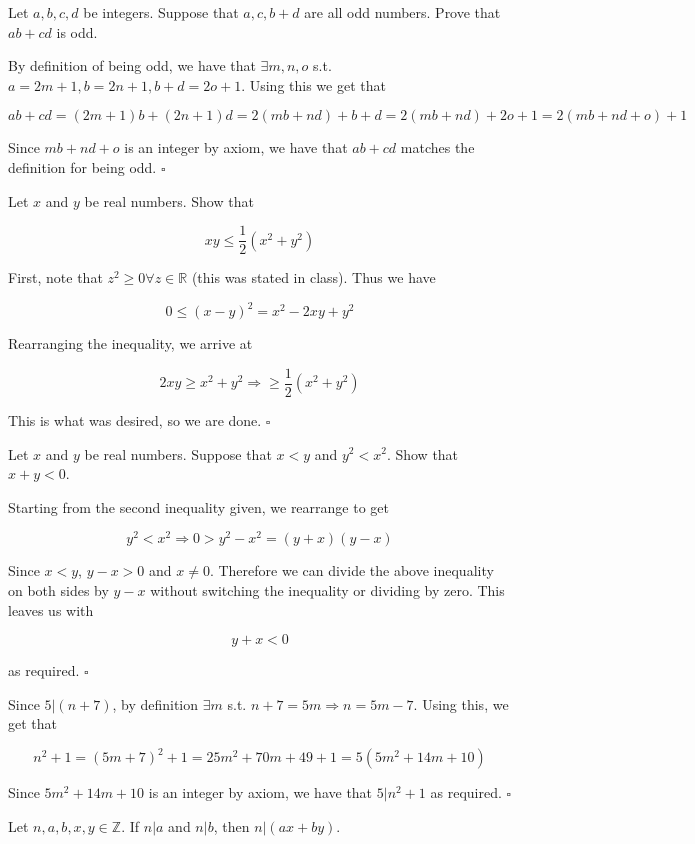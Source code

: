 \documentclass[letterpaper, reqno,11pt]{article}
\newcommand{\RR}{\mathbb{R}}
\newcommand{\ZZ}{\mathbb{Z}}
\begin{document}
 Let $a, b, c, d$ be integers. Suppose that $a, c, b+d$ are all odd numbers. Prove that $ab+cd$ is odd. 

\medskip

By definition of being odd, we have that $\exists m, n, o$ s.t. $a=2m+1, b=2n+1, b+d=2o+1$. Using this we get that 

$$
    ab+cd=(2m+1)b+(2n+1)d=2(mb+nd)+b+d=2(mb+nd)+2o+1=2(mb+nd+o)+1
$$

Since $mb+nd+o$ is an integer by axiom, we have that $ab+cd$ matches the definition for being odd. $\square$

 Let $x$ and $y$ be real numbers. Show that 

\medskip

$$
    xy\leq \frac12(x^2+y^2)
$$

\medskip

First, note that $z^2\geq0\forall z\in\RR$ (this was stated in class). Thus we have 

$$
    0 \leq (x-y)^2=x^2-2xy+y^2
$$

Rearranging the inequality, we arrive at 

$$
    2xy\geq x^2+y^2\Rightarrow \geq \frac12(x^2+y^2)
$$

This is what was desired, so we are done. $\square$

 Let $x$ and $y$ be real numbers. Suppose that $x<y$ and $y^2<x^2$. Show that $x+y<0$. 

\medskip

Starting from the second inequality given, we rearrange to get 

$$
    y^2<x^2\Rightarrow 0>y^2-x^2=(y+x)(y-x)
$$

Since $x<y$, $y-x>0$ and $x\neq 0$. Therefore we can divide the above inequality on both sides by $y-x$ without switching the inequality or dividing by zero. This leaves us with 

$$
    y+x<0
$$

as required. $\square$

 Since $5|(n+7)$, by definition $\exists m$ s.t. $n+7=5m\Rightarrow n=5m-7$. Using this, we get that 

\medskip

$$
    n^2+1=(5m+7)^2+1=25m^2+70m+49+1=5(5m^2+14m+10)
$$

Since $5m^2+14m+10$ is an integer by axiom, we have that $5|n^2+1$ as required. $\square$

 Let $n, a, b, x, y\in \ZZ$.  If $n|a$ and $n|b$, then $n|(ax+by)$.
\end{document}
